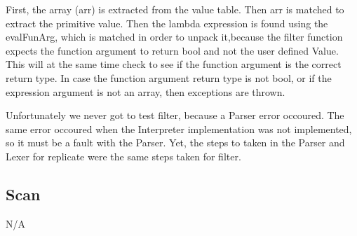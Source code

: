 First, the array (arr) is extracted from the value table. Then arr is matched to extract the primitive value. Then the lambda expression is found using the evalFunArg, which is matched in order to unpack it,because the filter function expects the function argument to return bool and not the user defined Value. This will at the same time check to see if the function argument is the correct return type. In case the function argument return type is not bool, or if the expression argument is not an array, then exceptions are thrown.

Unfortunately we never got to test filter, because a Parser error occoured. The same error occoured when the Interpreter implementation was not implemented, so it must be a fault with the Parser. Yet, the steps to taken in the Parser and Lexer for replicate were the same steps taken for filter. 

\subsection*{Scan}
N/A